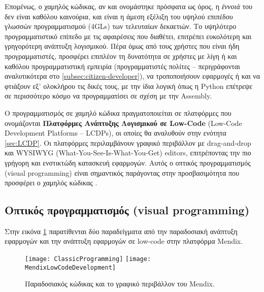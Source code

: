         Επομένως, ο χαμηλός κώδικας, αν και ονομάστηκε πρόσφατα ως όρος, η \textit{έννοιά} του δεν είναι καθόλου καινούρια, και είναι η άμεση εξέλιξη του υψηλού επιπέδου γλωσσών προγραμματισμού (4GLs) των τελευταίων δεκαετιών. Το υψηλότερο προγραμματιστικό επίπεδο με τις αφαιρέσεις που διαθέτει, επιτρέπει ευκολότερη και γρηγορότερη ανάπτυξη λογισμικού. Πέρα όμως από τους χρήστες που είναι ήδη προγραμματιστές, προσφέρει επιπλέον τη δυνατότητα σε χρήστες με λίγη ή και καθόλου προγραμματιστική εμπειρία (προγραμματιστές πολίτες -- περιγράφονται αναλυτικότερα στο \ref{subsec:citizen-developer}), να τροποποιήσουν εφαρμογές ή και να φτιάξουν εξ' ολοκλήρου τις δικές τους, με την ίδια λογική όπως η Python επέτρεψε σε περισσότερο κόσμο να προγραμματίσει σε σχέση με την Assembly.

        Ο προγραμματισμός σε χαμηλό κώδικα πραγματοποιείται σε πλατφόρμες που ονομάζονται \textbf{Πλατφόρμες Ανάπτυξης Λογισμικού σε Low-Code} (Low-Code Development Platforms -- LCDPs), οι οποίες θα αναλυθούν στην ενότητα \ref{sec:LCDP}. Οι πλατφόρμες περιλαμβάνουν γραφικό περιβάλλον με drag-and-drop και WYSIWYG (What-You-See-Is-What-You-Get) editors, επιτρέποντας την πιο γρήγορη και ενστικτώδη κατασκευή εφαρμογών. Αυτός ο οπτικός προγραμματισμός (visual programming) είναι σημαντικός παράγοντας στην προσβασιμότητα που προσφέρει ο χαμηλός κώδικας \cite{LowCodeMendix} \cite{LowCodeSimon} \cite{LowCodeDemocratization}.

            \subsection{Οπτικός προγραμματισμός (visual programming)}
                Στην εικόνα \ref{fig:codevsmendix} παρατίθενται δύο παραδείγματα από την παραδοσιακή ανάπτυξη εφαρμογών και την ανάπτυξη εφαρμογών σε low-code στην πλατφόρμα Mendix.

                \begin{figure}[h!] \noindent
                    \texttt{[image: ClassicProgramming]}
                    \texttt{[image: MendixLowCodeDevelopment]}
                    \caption{Παραδοσιακός κώδικας και το γραφικό περιβάλλον του Mendix.}
                    \label{fig:codevsmendix}
                \end{figure}

